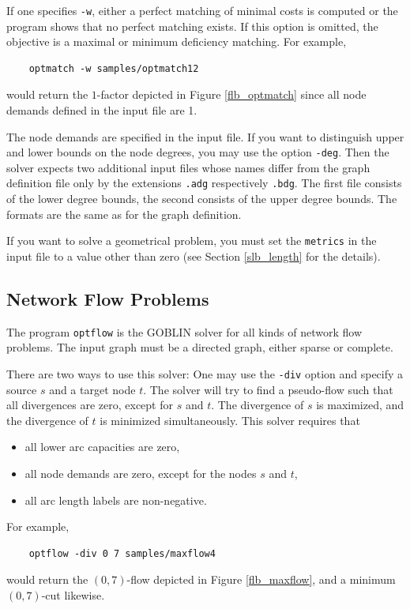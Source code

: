 \documentclass[a4paper,11pt,twoside]{book}
\begin{document}
\begin{multicols}{2}
If one specifies \verb/-w/, either a perfect matching of minimal costs is
computed or the program shows that no perfect matching exists. If this option
is omitted, the objective is a maximal or minimum deficiency matching. For
example,
\begin{verbatim}
    optmatch -w samples/optmatch12
\end{verbatim}
would return the $1$-factor depicted in Figure \ref{flb_optmatch} since all
node demands defined in the input file are 1.

The node demands are specified in the input file. If you want to distinguish
upper and lower bounds on the node degrees, you may use the option \verb/-deg/.
Then the solver expects two additional input files whose names differ from
the graph definition file only by the extensions \verb/.adg/ respectively
\verb/.bdg/. The first file consists of the lower degree bounds, the second
consists of the upper degree bounds. The formats are the same as for the
graph definition.

If you want to solve a geometrical problem, you must set the \verb/metrics/ in
the input file to a value other than zero (see Section \ref{slb_length} for the
details).


\subsection{Network Flow Problems}
The program \verb/optflow/ is the GOBLIN solver for all kinds of network flow
problems. The input graph must be a directed graph, either sparse or complete.

There are two ways to use this solver: One may use the \verb/-div/ option
and specify a source $s$ and a target node $t$. The solver will try to find a
pseudo-flow such that all divergences are zero, except for $s$ and $t$. The
divergence of $s$ is maximized, and the divergence of $t$ is minimized
simultaneously. This solver requires that
\begin{itemize}
\item all lower arc capacities are zero,
\item all node demands are zero, except for the nodes $s$ and $t$,
\item all arc length labels are non-negative.
\end{itemize}
For example,
\begin{verbatim}
    optflow -div 0 7 samples/maxflow4
\end{verbatim}
would return the $(0,7)$-flow depicted in Figure \ref{flb_maxflow}, and a
minimum $(0,7)$-cut likewise.


\end{multicols}
\end{document}
